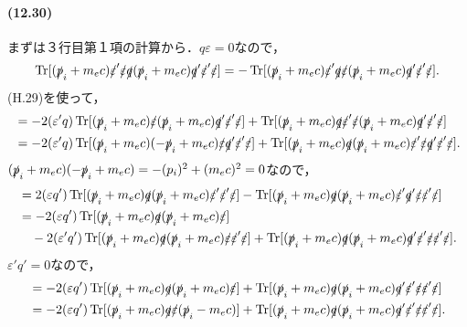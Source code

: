\paragraph{(12.30)}
まずは３行目第１項の計算から．$q\varepsilon=0$なので，
\[\operatorname{Tr} [(\slashed{p}_i+m_ec)\slashed{\varepsilon}'\slashed{\varepsilon}\slashed{q}(\slashed{p}_i+m_ec)\slashed{q}'\slashed{\varepsilon}'\slashed{\varepsilon}] = -\operatorname{Tr} [(\slashed{p}_i+m_ec)\slashed{\varepsilon}'\slashed{q}\slashed{\varepsilon}(\slashed{p}_i+m_ec)\slashed{q}'\slashed{\varepsilon}'\slashed{\varepsilon}].\]
(H.29)を使って，
\begin{align*}
  & = -2(\varepsilon'q)\operatorname{Tr} [(\slashed{p}_i+m_ec)\slashed{\varepsilon}(\slashed{p}_i+m_ec)\slashed{q}'\slashed{\varepsilon}'\slashed{\varepsilon}]
  + \operatorname{Tr} [(\slashed{p}_i+m_ec)\slashed{q}\slashed{\varepsilon}'\slashed{\varepsilon}(\slashed{p}_i+m_ec)\slashed{q}'\slashed{\varepsilon}'\slashed{\varepsilon}]\\
  & = -2(\varepsilon'q)\operatorname{Tr} [(\slashed{p}_i+m_ec)(-\slashed{p}_i+m_ec)\slashed{\varepsilon}\slashed{q}'\slashed{\varepsilon}'\slashed{\varepsilon}]
  + \operatorname{Tr} [(\slashed{p}_i+m_ec)\slashed{q}(\slashed{p}_i+m_ec)\slashed{\varepsilon}'\slashed{\varepsilon}\slashed{q}'\slashed{\varepsilon}'\slashed{\varepsilon}].
\end{align*}
$(\slashed{p}_i+m_ec)(-\slashed{p}_i+m_ec)=-(p_i)^2+(m_ec)^2=0$なので，
\begin{align*}
  & = 2(\varepsilon q')\operatorname{Tr} [(\slashed{p}_i+m_ec)\slashed{q}(\slashed{p}_i+m_ec)\slashed{\varepsilon}'\slashed{\varepsilon}'\slashed{\varepsilon}]
  - \operatorname{Tr} [(\slashed{p}_i+m_ec)\slashed{q}(\slashed{p}_i+m_ec)\slashed{\varepsilon}'\slashed{q}'\slashed{\varepsilon}\slashed{\varepsilon}'\slashed{\varepsilon}]\\
  & = -2(\varepsilon q')\operatorname{Tr} [(\slashed{p}_i+m_ec)\slashed{q}(\slashed{p}_i+m_ec)\slashed{\varepsilon}]\\
  & \quad - 2(\varepsilon'q')\operatorname{Tr} [(\slashed{p}_i+m_ec)\slashed{q}(\slashed{p}_i+m_ec)\slashed{\varepsilon}\slashed{\varepsilon}'\slashed{\varepsilon}] + \operatorname{Tr} [(\slashed{p}_i+m_ec)\slashed{q}(\slashed{p}_i+m_ec)\slashed{q}'\slashed{\varepsilon}'\slashed{\varepsilon}\slashed{\varepsilon}'\slashed{\varepsilon}].
\end{align*}
$\varepsilon'q'=0$なので，
\begin{align*}
  & = -2(\varepsilon q')\operatorname{Tr} [(\slashed{p}_i+m_ec)\slashed{q}(\slashed{p}_i+m_ec)\slashed{\varepsilon}] + \operatorname{Tr} [(\slashed{p}_i+m_ec)\slashed{q}(\slashed{p}_i+m_ec)\slashed{q}'\slashed{\varepsilon}'\slashed{\varepsilon}\slashed{\varepsilon}'\slashed{\varepsilon}]\\
  & = -2(\varepsilon q')\operatorname{Tr} [(\slashed{p}_i+m_ec)\slashed{q}\slashed{\varepsilon}(\slashed{p}_i-m_ec)] + \operatorname{Tr} [(\slashed{p}_i+m_ec)\slashed{q}(\slashed{p}_i+m_ec)\slashed{q}'\slashed{\varepsilon}'\slashed{\varepsilon}\slashed{\varepsilon}'\slashed{\varepsilon}].
\end{align*}
